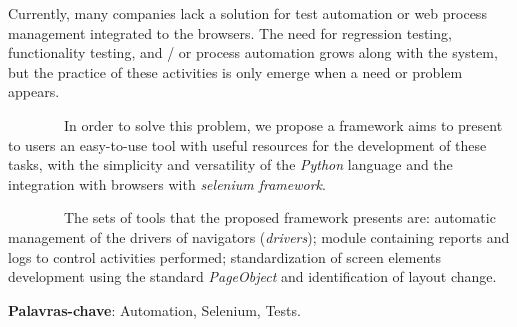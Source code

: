 %
%

\begin{ABSTRACT}
	\begin{SingleSpace}


        Currently, many companies lack a solution for  test automation or web process management integrated to the browsers.
        The need for regression testing, functionality testing, and / or process automation grows along with the system,
        but the practice of these activities is only emerge when a need or problem appears.

        In order to solve this problem, we propose a framework aims to present to  users an easy-to-use tool with useful resources for the development of these
        tasks, with the simplicity and versatility of the \textit{Python} language and the integration with browsers with \textit{selenium framework}.

        The sets of tools that the proposed framework presents are: automatic management of the drivers of navigators (\textit{drivers}); module containing reports
        and logs to control activities performed; standardization of screen elements development using the standard \textit{PageObject} and identification of layout change.

		\vspace*{0.5cm}\hspace{-1.3 cm}\textbf{Palavras-chave}: Automation, Selenium, Tests.


	\end{SingleSpace}

\end{ABSTRACT}
